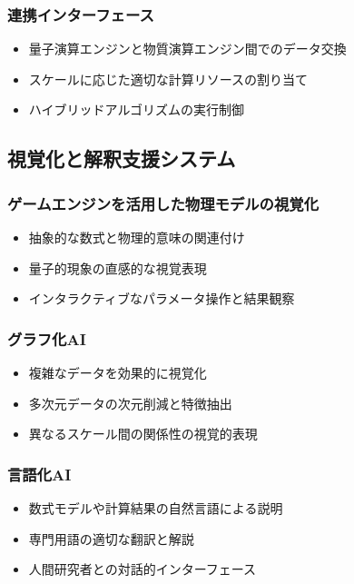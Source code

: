 \documentclass[12pt,a4paper]{article}
\begin{document}
\subsubsection{連携インターフェース}
\begin{itemize}
\item 量子演算エンジンと物質演算エンジン間でのデータ交換
\item スケールに応じた適切な計算リソースの割り当て
\item ハイブリッドアルゴリズムの実行制御
\end{itemize}

\subsection{視覚化と解釈支援システム}

\subsubsection{ゲームエンジンを活用した物理モデルの視覚化}
\begin{itemize}
\item 抽象的な数式と物理的意味の関連付け
\item 量子的現象の直感的な視覚表現
\item インタラクティブなパラメータ操作と結果観察
\end{itemize}

\subsubsection{グラフ化AI}
\begin{itemize}
\item 複雑なデータを効果的に視覚化
\item 多次元データの次元削減と特徴抽出
\item 異なるスケール間の関係性の視覚的表現
\end{itemize}

\subsubsection{言語化AI}
\begin{itemize}
\item 数式モデルや計算結果の自然言語による説明
\item 専門用語の適切な翻訳と解説
\item 人間研究者との対話的インターフェース
\end{itemize}
\end{document}

